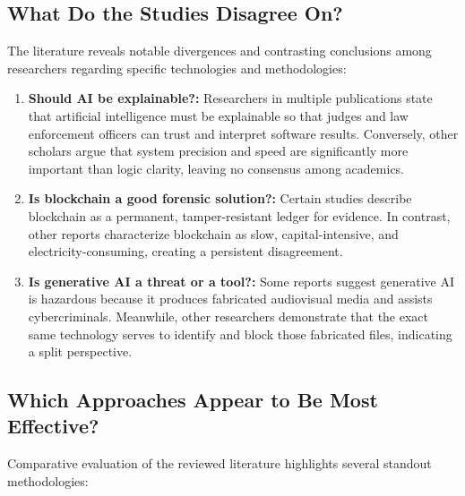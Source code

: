 \documentclass[12pt,a4paper]{article}
\begin{document}
\newpage
\subsection{What Do the Studies Disagree On?}

The literature reveals notable divergences and contrasting conclusions among researchers regarding specific technologies and methodologies:

\begin{enumerate}
    \item \textbf{Should AI be explainable?:} Researchers in multiple publications state that artificial intelligence must be explainable so that judges and law enforcement officers can trust and interpret software results. Conversely, other scholars argue that system precision and speed are significantly more important than logic clarity, leaving no consensus among academics.
    \item \textbf{Is blockchain a good forensic solution?:} Certain studies describe blockchain as a permanent, tamper-resistant ledger for evidence. In contrast, other reports characterize blockchain as slow, capital-intensive, and electricity-consuming, creating a persistent disagreement.
    \item \textbf{Is generative AI a threat or a tool?:} Some reports suggest generative AI is hazardous because it produces fabricated audiovisual media and assists cybercriminals. Meanwhile, other researchers demonstrate that the exact same technology serves to identify and block those fabricated files, indicating a split perspective.
\end{enumerate}


\subsection{Which Approaches Appear to Be Most Effective?}

Comparative evaluation of the reviewed literature highlights several standout methodologies:
\end{document}
